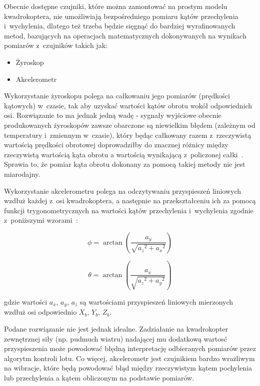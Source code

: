 \documentclass[11pt, twoside]{Thesis} %
\begin{document}
Obecnie dostępne czujniki, które można zamontować na prostym modelu kwadrokoptera, nie umożliwiają bezpośredniego pomiaru kątów przechylenia i~wychylenia, dlatego też trzeba będzie sięgnąć do bardziej wyrafinowanych metod, bazujących na operacjach matematycznych dokonywanych na wynikach pomiarów z~czujników takich jak:

\begin{itemize}
	\item Żyroskop
	\item Akcelerometr
\end{itemize} 

Wykorzystanie żyroskopu polega na całkowaniu jego pomiarów (prędkości kątowych) w~czasie, tak aby uzyskać wartości kątów obrotu wokół odpowiednich osi. Rozwiązanie to ma jednak jedną wadę - sygnały wyjściowe obecnie produkowanych  żyroskopów zawsze obarczone są niewielkim błędem (zależnym od temperatury i~zmiennym w~czasie), który będąc całkowany razem z~rzeczywistą wartością prędkości obrotowej doprowadziłby do znacznej różnicy między rzeczywistą wartością kąta obrotu a wartością wynikającą z~policzonej całki~\cite{quadro9, filters1}. Sprawia to, że pomiar kąta obrotu dokonany za pomocą takiej metody nie jest miarodajny.

Wykorzystanie akcelerometru polega na odczytywaniu przyspieszeń liniowych wzdłuż każdej z~osi kwadrokoptera, a następnie na przekształceniu ich za pomocą funkcji trygonometrycznych na wartości kątów przechylenia i~wychylenia zgodnie z~poniższymi wzorami~\cite{mems5}:

\begin{equation}
	\phi = \arctan(\frac{a_y}{\sqrt{a{_z}^2 + a{_x}^2}})
\end{equation}

\begin{equation}
	\theta = \arctan(\frac{a_x}{\sqrt{a{_z}^2 + a{_y}^2}})
\end{equation}

gdzie wartości $a_x$, $a_y$, $a_z$ są wartościami przyspieszeń liniowych mierzonych wzdłuż osi odpowiednio $X_b$, $Y_b$, $Z_b$.

Podane rozwiązanie nie jest jednak idealne. Zadziałanie na kwadrokopter zewnętrznej siły (np. pudmuch wiatru) nadającej mu dodatkową wartosć przyspieszenia może powodować błędną interpretację odbieranych pomiarów przez algorytm kontroli lotu. Co więcej, akcelerometr jest czujnikiem bardzo wrażliwym na wibracje, które będą powodować błąd między rzeczywistym kątem pochylenia lub przechylenia a kątem obliczonym na podstawie pomiarów.
\end{document}
